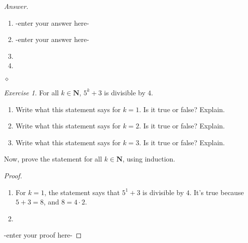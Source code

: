 \documentclass[12pt,oneside]{amsart}
\theoremstyle{remark}
\newtheorem{exer}{Exercise}
\newenvironment{answer}{\bigskip\noindent\emph{Answer.}}{\hfill$\diamond$\newline}
\begin{document}
\begin{answer}
\begin{enumerate}[label={(\roman*)},start={4}]
\item -enter your answer here-
\item -enter your answer here-
\item
\item
\end{enumerate}
\end{answer}

\newpage
\begin{exer}
For all $k \in \mathbf{N}$, $5^k + 3$ is divisible by $4$.
\begin{enumerate}
\item Write what this statement says for $k=1$. Is it true or false? Explain.
\item Write what this statement says for $k=2$. Is it true or false? Explain.
\item Write what this statement says for $k=3$. Is it true or false? Explain.
\end{enumerate}
Now, prove the statement for all $k \in \mathbf{N}$, using induction.
\end{exer}

\begin{proof}
\begin{enumerate}
\item For $k=1$, the statement says that $5^1+3$ is divisible by $4$.
It's true because $5+3=8$, and $8 = 4 \cdot 2$.
\item
\end{enumerate}
-enter your proof here-
\end{proof}
\end{document}
